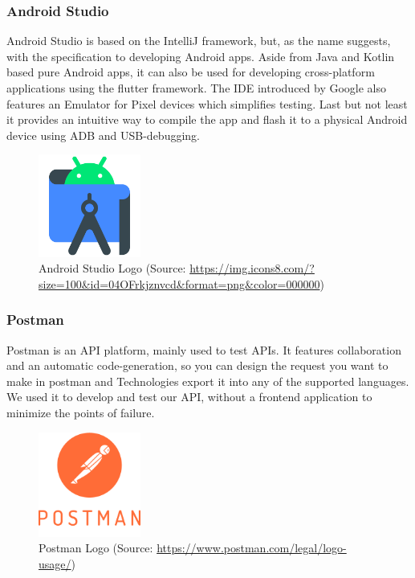 \subsubsection{Android Studio}
Android Studio is based on the IntelliJ framework, but, as the name suggests, with the specification to developing Android apps. Aside from Java and Kotlin based pure Android apps, it can also be used for developing cross-platform applications using the flutter framework. The IDE introduced by Google also features an Emulator for Pixel devices which simplifies testing. Last but not least it provides an intuitive way to compile the app and flash it to a physical Android device using ADB and USB-debugging. 

\begin{figure} [H]
    \center
    \includegraphics [width=0.3\textwidth] {images/Technologies/androidstudioLogo.png}
    \caption{Android Studio Logo (Source: \url{https://img.icons8.com/?size=100&id=04OFrkjznvcd&format=png&color=000000})}
\end{figure}

\subsubsection{Postman}
Postman is an API platform, mainly used to test APIs.  It features collaboration and an automatic code-generation, so you can design the request you want to make in postman and Technologies export it into any of the supported languages. We used it to develop and test our API, without a frontend application to minimize the points of failure.

\begin{figure} [H]
    \center
    \includegraphics [width=0.3\textwidth] {images/Technologies/postmanLogo.png}
    \caption{Postman Logo (Source: \url{https://www.postman.com/legal/logo-usage/})}
\end{figure}

\newpage